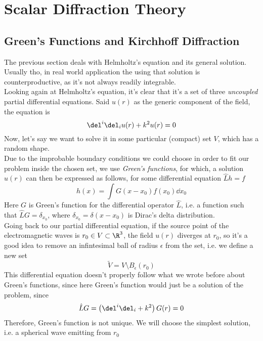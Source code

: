 \documentclass[../electromagnetism.tex]{subfiles}
\begin{document}
\section{Scalar Diffraction Theory}
\subsection{Green's Functions and Kirchhoff Diffraction}
The previous section deals with Helmholtz's equation and its general solution. Usually tho, in real world application the using that solution is counterproductive, as it's not always readily integrable.\\
Looking again at Helmholtz's equation, it's clear that it's a set of three \textit{uncoupled} partial differential equations. Said $u(r)$ as the generic component of the field, the equation is
\begin{equation}
	\del^i\del_iu(r)+k^2u(r)=0
	\label{eq:helmholtzsdt}
\end{equation}
Now, let's say we want to solve it in some particular (compact) set $V$, which has a random shape.\\
Due to the improbable boundary conditions we could choose in order to fit our problem inside the chosen set, we use \textit{Green's functions}, for which, a solution $u(r)$ can then be expressed as follows, for some differential equation $\hat{L}h=f$
\begin{equation*}
	h(x)=\int G(x-x_0)f(x_0)\dd{x_0}
\end{equation*}
Here $G$ is Green's function for the differential operator $\hat{L}$, i.e. a function such that $\hat{L}G=\delta_{x_0}$, where $\delta_{x_0}=\delta(x-x_0)$ is Dirac's delta distribution.\\
Going back to our partial differential equation, if the source point of the electromagnetic waves is $r_0\in V\subset\R^3$, the field $u(r)$ diverges at $r_0$, so it's a good idea to remove an infintesimal ball of radius $\epsilon$ from the set, i.e. we define a new set 
\begin{equation*}
	\tilde{V}=V\setminus B_\epsilon(r_0)
\end{equation*}
This differential equation doesn't properly follow what we wrote before about Green's functions, since here Green's function would just be a solution of the problem, since
\begin{equation*}
	\hat{L}G=\left( \del^i\del_i+k^2 \right)G(r)=0
\end{equation*}
Therefore, Green's function is not unique. We will choose the simplest solution, i.e. a spherical wave emitting from $r_0$
\end{document}
